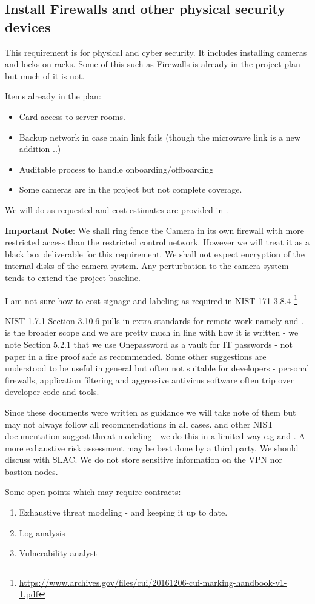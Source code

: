 
\subsection{Install Firewalls and other physical security devices} \label{sec:2firewalls}

This requirement is for physical and cyber security. It includes installing cameras and locks on racks.
Some of this such as Firewalls is already in the project plan but much of it is not.

Items already in the plan:
\begin{itemize}
\item Card access to server rooms.
\item Backup network in case main link fails (though the microwave link is a new addition ..)
\item Auditable process to handle onboarding/offboarding
\item Some cameras are in the project but not complete coverage.

\end{itemize}

We will do as requested and cost estimates are provided in .

{\bf Important Note}: We shall ring fence the Camera in its own firewall with more restricted access than the restricted control network.
However we will treat it as a black box deliverable for this requirement. We shall not expect encryption of the internal disks of the camera system. Any perturbation to the camera system tends to extend the project baseline.

I am not sure how to cost signage and labeling as required in NIST 171 3.8.4 \footnote{\url{https://www.archives.gov/files/cui/20161206-cui-marking-handbook-v1-1.pdf}}

NIST 1.7.1 Section 3.10.6 pulls in extra standards for remote work namely  and .
 is the broader scope and we are pretty much in line with how it is written - we note Section 5.2.1 that we use Onepassword as a vault for IT passwords - not paper in a fire proof safe as recommended.
Some other suggestions are understood to be useful in general but often not suitable for developers - personal firewalls, application filtering  and aggressive antivirus software often trip over developer code and tools.

Since these documents were written  as guidance we will take note of them but may not always follow all recommendations in all cases.
 and other NIST documentation suggest threat modeling - we do this in a limited way e.g  and . A more exhaustive risk assessment may be best done by a third party. We should discuss with SLAC.
We do not store sensitive information on the VPN nor bastion nodes.








Some open points which may require contracts:
\begin{enumerate}
\item Exhaustive threat modeling - and keeping it up to date.
\item Log analysis
\item Vulnerability analyst
\end{enumerate}
